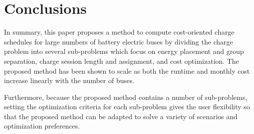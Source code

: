 \section{Conclusions}
In summary, this paper proposes a method to compute cost-oriented charge schedules for large numbers of battery electric buses by dividing the charge problem into several sub-problems which focus on energy placement and group separation, charge session length and assignment, and cost optimization. The proposed method has been shown to scale as both the runtime and monthly cost increase linearly with the number of buses. 
\par Furthermore, because the proposed method contains a number of sub-problems, setting the optimization criteria for each sub-problem gives the user flexibility so that the proposed method can be adapted to solve a variety of scenarios and optimization preferences.
